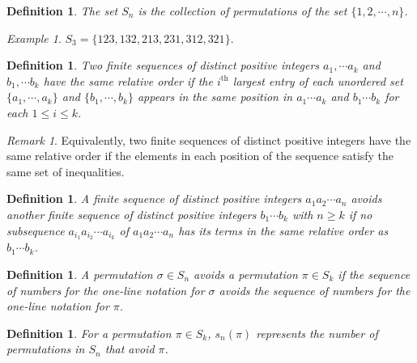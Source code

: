 \documentclass[11pt,letterpaper,twoside,english]{article}
\theoremstyle{theorem}
\newtheorem{definition}[theorem]{Definition}
\theoremstyle{remark}
\newtheorem{remark}{Remark}
\newtheorem{example}{Example}
\begin{document}
\begin{definition}
The set $S_n$ is the collection of permutations of the set $\{1,2,\cdots, n\}$. 
\end{definition}

\begin{example}
$S_3=\{123,132,213,231,312,321\}$. 
\end{example}








\begin{definition}
Two finite sequences of distinct positive integers $a_1,\cdots a_k$ and $b_1,\cdots b_k$ have the same relative order if the $i^\text{th}$ largest entry of each unordered set $\{a_1,\cdots,a_k\}$ and $\{b_1,\cdots, b_k\}$ appears in the same position in $a_1\cdots a_k$ and $b_1\cdots b_k$ for each $1\le i\le k$. 
\end{definition}

\begin{remark}
Equivalently, two finite sequences of distinct positive integers have the same relative order if the elements in each position of the sequence satisfy the same set of inequalities.
\end{remark}

\begin{definition}
A finite sequence of distinct positive integers $a_1a_2\cdots a_n$ avoids another finite sequence of distinct positive integers $b_1\cdots b_k$ with $n\ge k$ if no subsequence $a_{i_1}a_{i_2}\cdots a_{i_k}$ of $a_1a_2\cdots a_n$ has its terms in the same relative order as $b_1\cdots b_k$. 
\end{definition}


\begin{definition} 
A permutation $\sigma\in S_n$ avoids a permutation $\pi\in S_k$ if the sequence of numbers for the one-line notation for $\sigma$ avoids the sequence of numbers for the one-line notation for $\pi$.
\end{definition}

\begin{definition}
For a permutation $\pi\in S_k$, $s_n(\pi)$ represents the number of permutations in $S_n$ that avoid $\pi$. 
\end{definition}
\end{document}
